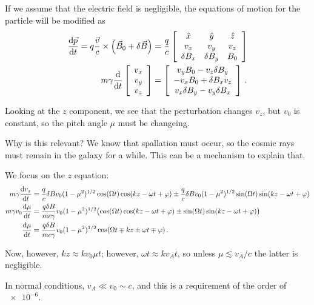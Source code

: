\documentclass[main.tex]{subfiles}
\begin{document}
If we assume that the electric field is negligible, the equations of motion for the particle will be modified as 
%
\begin{align}
\dv{\vec{p}}{t} = q \frac{\vec{v}}{c} \times \qty(\vec{B}_0 + \delta \vec{B})  &= \frac{q}{c} \left[\begin{array}{ccc}
\hat{x}  & \hat{y} & \hat{z} \\ 
v_x & v_y & v_z \\ 
\delta B_x & \delta B_y & B_0 
\end{array}\right]  \\
m \gamma \dv{}{t} \left[\begin{array}{c}
v_x \\ 
v_y \\ 
v_z
\end{array}\right]
&= 
\left[\begin{array}{c}
v_y B_0 - v_z \delta B_y \\ 
- v_x B_0 + \delta B_x v_z \\ 
v_x \delta B_y - v_y \delta B_x
\end{array}\right]
\,.
\end{align}

Looking at the \(z\) component, we see that the perturbation changes \(v_z\), but \(v_0 \) is constant, so the pitch angle \(\mu \) must be changeing. 

Why is this relevant? We know that spallation must occur, so the cosmic rays must remain in the galaxy for a while. 
This can be a mechanism to explain that. 

We focus on the \(z\) equation: 
%
\begin{align}
m \gamma \dv{v_z}{ t} &= \frac{q}{c} \delta B v_0 (1 - \mu^2)^{1/2} \cos(\Omega t) \cos( k z  - \omega t + \varphi ) \pm \frac{q}{c} \delta  B v_0 (1 - \mu^2)^{1/2} \sin(\Omega  t) \sin(k z - \omega t + \varphi )  \\
m \gamma v_0 \dv{\mu }{t} &= \frac{q \delta B}{mc \gamma } v_0 (1 - \mu^2)^{1/2}  
\qty(\cos(\Omega t) \cos(k z - \omega t + \varphi ) \pm \sin(\Omega t) \sin(kz - \omega t + \varphi ))  \\
\dv{\mu }{t}&= \frac{q \delta B}{mc \gamma } v_0 (1 - \mu^2)^{1/2}
\cos(\Omega t \mp kz \pm \omega t \mp \varphi ) 
\,.
\end{align}

Now, however, \(kz \approx k v_0 \mu t\); however, \(\omega t \approx k v_A t\), so unless \(\mu \lesssim v_A /c \) the latter is negligible. 

In normal conditions, \(v_A \ll v_0 \sim c\), and this is a requirement of the order of \(\num{e-6}\). 
\end{document}
